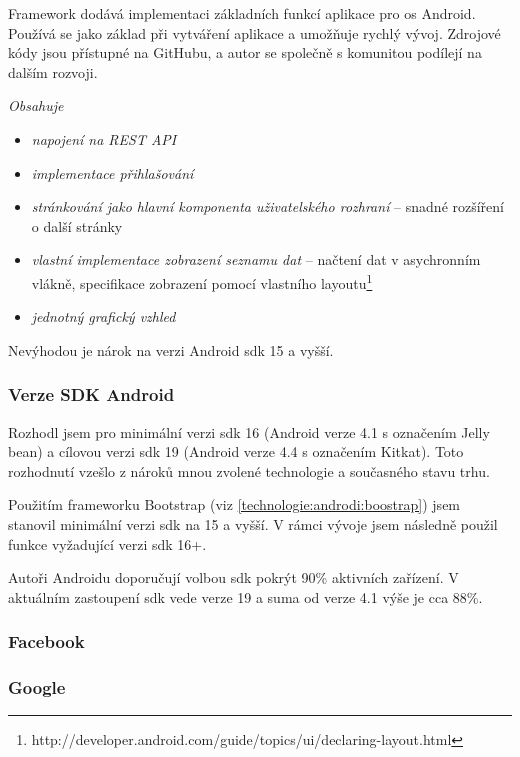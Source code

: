 \documentclass[thesis=B,czech]{FITthesis}[2012/06/26]
\begin{document}
Framework dodává implementaci základních funkcí aplikace pro \acrshort{os} Android. Používá se jako základ při vytváření aplikace a umožňuje rychlý vývoj. Zdrojové kódy jsou přístupné na GitHubu, a autor se společně s komunitou podílejí na dalším rozvoji.\newline

\textit{Obsahuje}
\begin{itemize}[nosep]
	\item \textit{napojení na REST API}
	\item \textit{implementace přihlašování}  
	\item \textit{stránkování jako hlavní komponenta uživatelského rozhraní} -- snadné rozšíření o další stránky
	\item \textit{vlastní implementace zobrazení seznamu dat} -- načtení dat v asychronním vlákně, specifikace zobrazení pomocí vlastního layoutu\footnote{http://developer.android.com/guide/topics/ui/declaring-layout.html}  
	\item \textit{jednotný grafický vzhled}	
\end{itemize}

Nevýhodou je nárok na verzi Android \acrshort{sdk} 15 a vyšší.


\subsubsection {Verze SDK Android}

Rozhodl jsem pro minimální verzi \acrshort{sdk} 16 (Android verze 4.1 s označením Jelly bean) a cílovou verzi \acrshort{sdk} 19 (Android verze 4.4 s označením Kitkat).
Toto rozhodnutí vzešlo z nároků mnou zvolené technologie a současného stavu trhu.

Použitím frameworku Bootstrap (viz \ref{technologie:androdi:boostrap}) jsem stanovil minimální verzi \acrshort{sdk} na 15 a vyšší. V rámci vývoje jsem následně použil funkce vyžadující verzi \acrshort{sdk} 16+.

Autoři Androidu doporučují volbou \acrshort{sdk} pokrýt 90\% aktivních zařízení\cite{android_sdk_recommendation}. V aktuálním zastoupení \acrshort{sdk} vede verze 19 a suma od verze 4.1 výše je cca 88\%\cite{android_sdk_graph}. 

\subsubsection{Facebook}

\subsubsection{Google}
\end{document}

